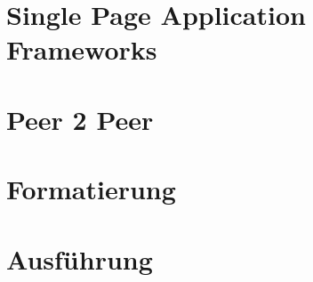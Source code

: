 \section{Single Page Application Frameworks}
\label{chap:validierung}

%
\section{Peer 2 Peer}
\label{chap:simulator}

%
\section{Formatierung}
\label{chap:metriken}

%
\section{Ausführung}
\label{chap:metriken}
